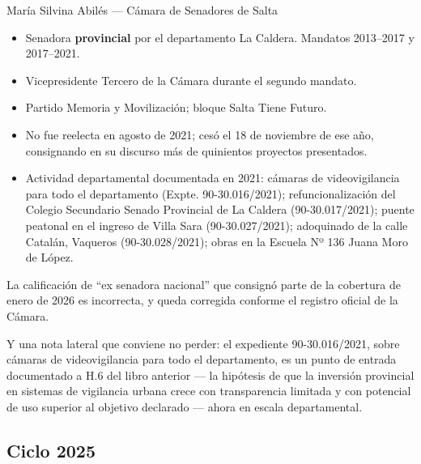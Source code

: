 \begin{ficha}{María Silvina Abilés --- Cámara de Senadores de Salta}
\begin{itemize}[leftmargin=*,nosep]
\item Senadora \textbf{provincial} por el departamento La Caldera. Mandatos 2013--2017 y 2017--2021.
\item Vicepresidente Tercero de la Cámara durante el segundo mandato.
\item Partido Memoria y Movilización; bloque Salta Tiene Futuro.
\item No fue reelecta en agosto de 2021; cesó el 18 de noviembre de ese año, consignando en su discurso más de quinientos proyectos presentados.
\item Actividad departamental documentada en 2021: cámaras de videovigilancia para todo el departamento (Expte. 90-30.016/2021); refuncionalización del Colegio Secundario Senado Provincial de La Caldera (90-30.017/2021); puente peatonal en el ingreso de Villa Sara (90-30.027/2021); adoquinado de la calle Catalán, Vaqueros (90-30.028/2021); obras en la Escuela Nº 136 Juana Moro de López.
\end{itemize}
\end{ficha}

\begin{cautela}
La calificación de ``ex senadora nacional'' que consignó parte de la cobertura de enero de 2026 es incorrecta, y queda corregida conforme el registro oficial de la Cámara.

Y una nota lateral que conviene no perder: el expediente 90-30.016/2021, sobre cámaras de videovigilancia para todo el departamento, es un punto de entrada documentado a H.6 del libro anterior --- la hipótesis de que la inversión provincial en sistemas de vigilancia urbana crece con transparencia limitada y con potencial de uso superior al objetivo declarado --- ahora en escala departamental.
\end{cautela}

\subsection*{Ciclo 2025}

